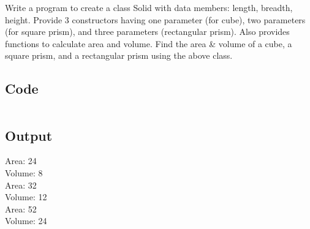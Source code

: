 \documentclass[../main.tex]{subfiles}
\begin{document}
Write a program to create a class Solid with data members: length, breadth,
height. Provide 3 constructors having one parameter (for cube), two parameters
(for square prism), and three parameters (rectangular prism). Also provides
functions to calculate area and volume. Find the area \& volume of a cube, a square
prism, and a rectangular prism using the above class.

\subsection{Code}
\inputminted[frame=lines, breaklines, breakanywhere, numberblanklines=false]{java}{./programs/prog4/Solid.java}

\subsection{Output}
Area: 24 \\
Volume: 8 \\
Area: 32 \\
Volume: 12 \\
Area: 52 \\
Volume: 24 \\
\end{document}
